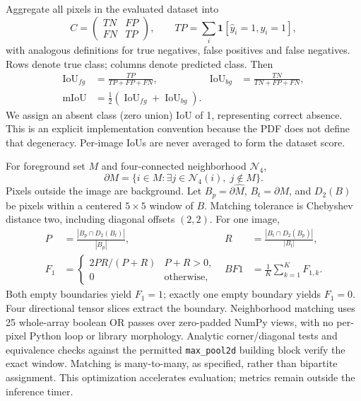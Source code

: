 \documentclass[11pt,a4paper]{article}
\begin{document}
Aggregate all pixels in the evaluated dataset into
\begin{equation}
C=\begin{pmatrix}TN&FP\\FN&TP\end{pmatrix},\qquad
TP=\sum_i\mathbf1[\hat y_i=1,y_i=1],
\end{equation}
with analogous definitions for true negatives, false positives and false negatives. Rows denote true class; columns denote predicted class. Then
\begin{align}
\operatorname{IoU}_{fg}&=\frac{TP}{TP+FP+FN}, &
\operatorname{IoU}_{bg}&=\frac{TN}{TN+FP+FN},\\
\operatorname{mIoU}&=\tfrac12(\operatorname{IoU}_{fg}+\operatorname{IoU}_{bg}).
\end{align}
We assign an absent class (zero union) IoU of 1, representing correct absence. This is an explicit implementation convention because the PDF does not define that degeneracy. Per-image IoUs are never averaged to form the dataset score.

For foreground set $M$ and four-connected neighborhood $\mathcal N_4$,
\begin{equation}
\partial M=\{i\in M:\exists j\in\mathcal N_4(i),\; j\notin M\}.
\end{equation}
Pixels outside the image are background. Let $B_p=\partial\hat M$, $B_t=\partial M$, and $D_2(B)$ be pixels within a centered $5\times5$ window of $B$. Matching tolerance is Chebyshev distance two, including diagonal offsets $(2,2)$. For one image,
\begin{align}
P&=\frac{|B_p\cap D_2(B_t)|}{|B_p|}, & R&=\frac{|B_t\cap D_2(B_p)|}{|B_t|},\\
F_1&=\begin{cases}2PR/(P+R)&P+R>0,\\0&\text{otherwise},\end{cases} &
BF1&=\frac1K\sum_{k=1}^K F_{1,k}.
\end{align}
Both empty boundaries yield $F_1=1$; exactly one empty boundary yields $F_1=0$. Four directional tensor slices extract the boundary. Neighborhood matching uses 25 whole-array boolean OR passes over zero-padded NumPy views, with no per-pixel Python loop or library morphology. Analytic corner/diagonal tests and equivalence checks against the permitted \texttt{max\_pool2d} building block verify the exact window. Matching is many-to-many, as specified, rather than bipartite assignment. This optimization accelerates evaluation; metrics remain outside the inference timer.
\end{document}
